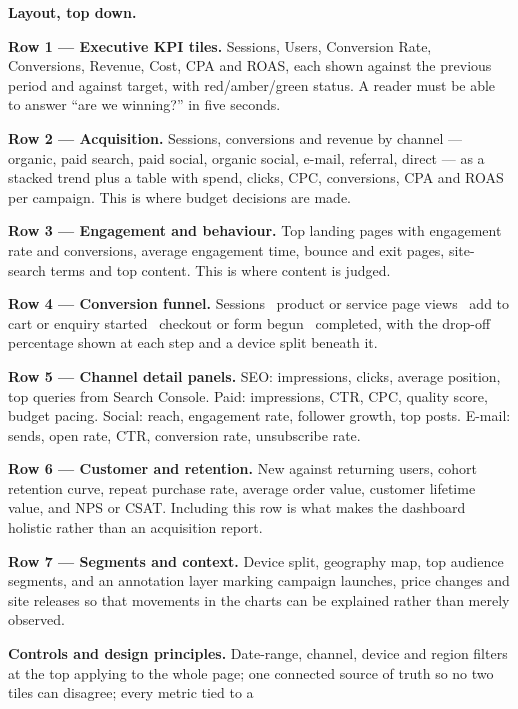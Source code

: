 \begin{qlist}
\textbf{Layout, top down.}
\begin{apts}
\item \textbf{Row 1 --- Executive KPI tiles.} Sessions, Users, Conversion Rate,
      Conversions, Revenue, Cost, CPA and ROAS, each shown against the previous
      period and against target, with red/amber/green status. A reader must be
      able to answer ``are we winning?'' in five seconds.
\item \textbf{Row 2 --- Acquisition.} Sessions, conversions and revenue by
      channel --- organic, paid search, paid social, organic social, e-mail,
      referral, direct --- as a stacked trend plus a table with spend, clicks,
      CPC, conversions, CPA and ROAS per campaign. This is where budget
      decisions are made.
\item \textbf{Row 3 --- Engagement and behaviour.} Top landing pages with
      engagement rate and conversions, average engagement time, bounce and exit
      pages, site-search terms and top content. This is where content is
      judged.
\item \textbf{Row 4 --- Conversion funnel.} Sessions \ra\ product or service
      page views \ra\ add to cart or enquiry started \ra\ checkout or form
      begun \ra\ completed, with the drop-off percentage shown at each step and
      a device split beneath it.
\item \textbf{Row 5 --- Channel detail panels.} SEO: impressions, clicks,
      average position, top queries from Search Console. Paid: impressions,
      CTR, CPC, quality score, budget pacing. Social: reach, engagement rate,
      follower growth, top posts. E-mail: sends, open rate, CTR, conversion
      rate, unsubscribe rate.
\item \textbf{Row 6 --- Customer and retention.} New against returning users,
      cohort retention curve, repeat purchase rate, average order value,
      customer lifetime value, and NPS or CSAT. Including this row is what
      makes the dashboard holistic rather than an acquisition report.
\item \textbf{Row 7 --- Segments and context.} Device split, geography map, top
      audience segments, and an annotation layer marking campaign launches,
      price changes and site releases so that movements in the charts can be
      explained rather than merely observed.
\item \textbf{Controls and design principles.} Date-range, channel, device and
      region filters at the top applying to the whole page; one connected
      source of truth so no two tiles can disagree; every metric tied to a

\end{apts}
\end{qlist}
